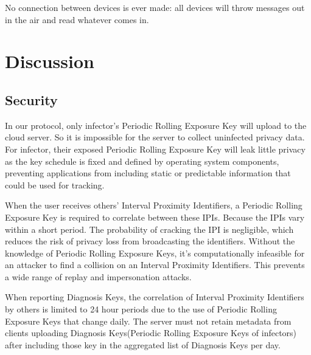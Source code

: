 \documentclass[11pt,en]{elegantpaper}
\begin{document}
No connection between devices is ever made: all devices will throw messages out in the air and read whatever comes in.

\section{Discussion}
\subsection{Security}
In our protocol, only infector's Periodic Rolling Exposure Key will upload to the cloud server. So it is impossible for the server to collect uninfected privacy data. For infector, their exposed Periodic Rolling Exposure Key will leak little privacy as the key schedule is fixed and defined by operating system components, preventing applications from including static or predictable information that could be used for tracking. 

When the user receives others' Interval Proximity Identifiers, a Periodic Rolling Exposure Key is required to correlate between these IPIs. Because the IPIs vary within a short period. The probability of cracking the  IPI  is negligible, which reduces the risk of privacy loss from broadcasting the identifiers. Without the knowledge of Periodic Rolling Exposure Keys, it's computationally infeasible for an attacker to find a collision on an Interval Proximity Identifiers. This prevents a wide range of replay and impersonation attacks. 

When reporting Diagnosis Keys, the correlation of Interval Proximity Identifiers by others is limited to 24 hour periods due to the use of Periodic Rolling Exposure Keys that change daily. The server must not retain metadata from clients uploading Diagnosis Keys(Periodic Rolling Exposure Keys of infectors) after including those key in the aggregated list of Diagnosis Keys per day.


\end{document}
